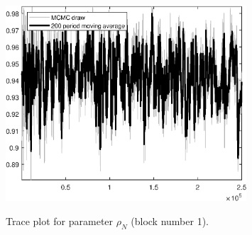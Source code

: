 \begin{figure}[H]
\centering
  \includegraphics[width=0.8\textwidth]{BRS/graphs/TracePlot_rho_N_blck_1}\\
    \caption{Trace plot for parameter ${\rho_N}$ (block number 1).}
\end{figure}
